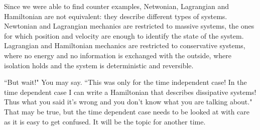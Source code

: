 \documentclass[11pt]{article}
\begin{document}
Since we were able to find counter examples, Netwonian, Lagrangian and Hamiltonian are not equivalent: they describe different types of systems. Newtonian and Lagrangian mechanics are restricted to massive systems, the ones for which position and velocity are enough to identify the state of the system. Lagrangian and Hamiltonian mechanics are restricted to conservative systems, where no energy and no information is exchanged with the outside, where isolation holds and the system is deterministic and reversible.

``But wait!" You may say. ``This was only for the time independent case! In the time dependent case I can write a Hamiltonian that describes dissipative systems! Thus what you said it's wrong and you don't know what you are talking about." That may be true, but the time dependent case needs to be looked at with care as it is easy to get confused. It will be the topic for another time.
\end{document}
